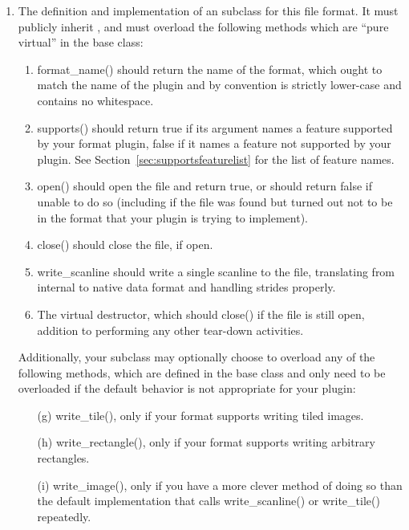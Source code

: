 \begin{enumerate}
\item The definition and implementation of an \ImageOutput subclass for
  this file format.  It must publicly inherit \ImageOutput, and must
  overload the following methods which are ``pure virtual'' in the
  \ImageOutput base class:

  \begin{enumerate}
    \item {\cf format_name()} should return the name of the format, which
      ought to match the name of the plugin and by convention is
      strictly lower-case and contains no whitespace.
    \item {\cf supports()} should return {\cf true} if its argument
      names a feature supported by your format plugin, {\cf false} if it
      names a feature not supported by your plugin.  See
      Section~\ref{sec:supportsfeaturelist} for the list of feature
      names.
    \item {\cf open()} should open the file and return true, or should
      return false if unable to do so (including if the file was found
      but turned out not to be in the format that your plugin is trying
      to implement).
    \item {\cf close()} should close the file, if open.
    \item {\cf write_scanline} should write a single scanline to
      the file, translating from internal to native data format and
      handling strides properly.
    \item The virtual destructor, which should {\cf close()} if the file
      is still open, addition to performing any other tear-down activities.
  \end{enumerate}
  
  Additionally, your \ImageOutput subclass may optionally choose to
  overload any of the following methods, which are defined in the
  \ImageOutput base class and only need to be overloaded if the default
  behavior is not appropriate for your plugin:

  \begin{enumerate}
    \item[(g)] {\cf write_tile()}, only if your format supports
      writing tiled images.
    \item[(h)] {\cf write_rectangle()}, only if your format supports
      writing arbitrary rectangles.
    \item[(i)] {\cf write_image()}, only if you have a more clever
      method of doing so than the default implementation that calls
      {\cf write_scanline()} or {\cf write_tile()} repeatedly.
  \end{enumerate}


\end{enumerate}
